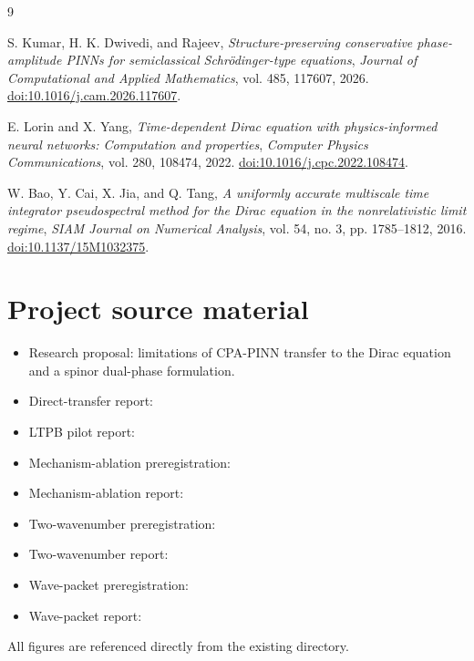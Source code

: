 \documentclass[a4paper,11pt]{article}
\begin{document}
\enlargethispage{3\baselineskip}
\begin{thebibliography}{9}
\raggedright
\footnotesize

S. Kumar, H. K. Dwivedi, and Rajeev,
\emph{Structure-preserving conservative phase-amplitude PINNs for semiclassical
Schr\"odinger-type equations},
\textit{Journal of Computational and Applied Mathematics}, vol. 485, 117607,
2026.
\href{https://doi.org/10.1016/j.cam.2026.117607}{doi:10.1016/j.cam.2026.117607}.

E. Lorin and X. Yang,
\emph{Time-dependent Dirac equation with physics-informed neural networks:
Computation and properties},
\textit{Computer Physics Communications}, vol. 280, 108474, 2022.
\href{https://doi.org/10.1016/j.cpc.2022.108474}{doi:10.1016/j.cpc.2022.108474}.

W. Bao, Y. Cai, X. Jia, and Q. Tang,
\emph{A uniformly accurate multiscale time integrator pseudospectral method for
the Dirac equation in the nonrelativistic limit regime},
\textit{SIAM Journal on Numerical Analysis}, vol. 54, no. 3, pp. 1785--1812,
2016.
\href{https://doi.org/10.1137/15M1032375}{doi:10.1137/15M1032375}.

\end{thebibliography}

\section{Project source material}

\begin{itemize}
  \item Research proposal: limitations of CPA-PINN transfer to the Dirac
  equation and a spinor dual-phase formulation.
  \item Direct-transfer report: 
  \item LTPB pilot report: 
  \item Mechanism-ablation preregistration:\newline
  \item Mechanism-ablation report:
  \item Two-wavenumber preregistration:\newline
  \item Two-wavenumber report:
  \item Wave-packet preregistration:\newline
  \item Wave-packet report:\newline
\end{itemize}

All figures are referenced directly from the existing
 directory.
\end{document}
